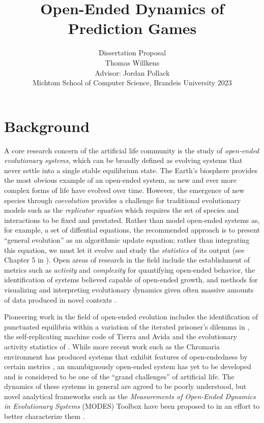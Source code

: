\documentclass{article}
\title{Open-Ended Dynamics of Prediction Games}
\author{Dissertation Proposal\\
    Thomas Willkens\\
    Advisor: Jordan Pollack\\
    Michtom School of Computer Science, Brandeis University 2023
    }
\date{}
\begin{document}
\maketitle

\section*{Background}
A core research concern of the artificial life community is the study of
\textit{open-ended evolutionary systems}, which can be broadly defined as evolving systems that
never settle into a single stable equilibrium state. The Earth's biosphere provides the most
obvious example of an open-ended system, as new and ever more complex forms of life have evolved over 
time. However, the emergence of new species through \textit{coevolution} 
provides a challenge for traditional evolutionary models
such as the \textit{replicator equation} which requires the set of species and interactions to be 
fixed and prestated. Rather than model open-ended systems as, for example, a set of diffential equations, 
the recommended approach is to present ``general evolution'' as an algorithmic update equation;
rather than integrating this equation, we must let it evolve and study the \textit{statistics}
of its output (see Chapter 5 in \citep{thurner2018}). 
Open areas of research in the field include the establishment of metrics such as 
\textit{activity} and \textit{complexity} for quantifying open-ended behavior, the 
identification of systems believed capable of open-ended growth, and methods for visualizing 
and interpreting evolutionary dynamics given often massive amounts of data produced in novel 
contexts \citep{packard2019,stepney2021modelling,dolson2020}.

Pioneering work in the field of open-ended evolution includes the identification of punctuated 
equilibria within a variation of the
iterated prisoner's dilemma in \citet{lindgren1994evolutionary}, the self-replicating machine 
code of Tierra and Avida \citep{ray1992evolution,ofria2004avida} and the evolutionary activity 
statistics of \citet{Channon2001PassingTA}. While more recent work such as the Chromaria environment has produced  
systems that exhibit features of open-endedness
by certain metrics \citep{adams2017formal,soros2014identifying}, an unambiguously open-ended 
system has yet to be developed and is considered 
to be one of the ``grand challenges'' of artificial life. The dynamics of these systems in 
general are agreed to be poorly understood, but novel analytical frameworks such as the 
\textit{Measurements of Open-Ended Dynamics in Evolutionary Systems} (MODES) Toolbox have been
proposed to in an effort to better characterize them \citep{dolson2019modes}.
\end{document}

